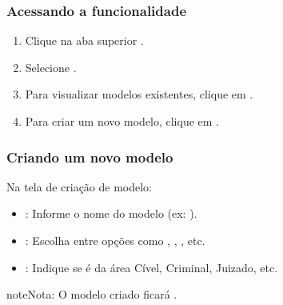 \documentclass[letterpaper,10pt,brazil]{sphinxmanual}
\begin{document}
\subsubsection{Acessando a funcionalidade}
\label{\detokenize{projud_48_criandomodelo:acessando-a-funcionalidade}}\begin{enumerate}
%
\item {} 
\sphinxAtStartPar
Clique na aba superior .

\item {} 
\sphinxAtStartPar
Selecione .

\item {} 
\sphinxAtStartPar
Para visualizar modelos existentes, clique em .

\item {} 
\sphinxAtStartPar
Para criar um novo modelo, clique em .

\end{enumerate}


\subsubsection{Criando um novo modelo}
\label{\detokenize{projud_48_criandomodelo:criando-um-novo-modelo}}
\sphinxAtStartPar
Na tela de criação de modelo:
\begin{itemize}
\item {} 
\sphinxAtStartPar
{}: Informe o nome do modelo (ex: ).

\item {} 
\sphinxAtStartPar
{}: Escolha entre opções como , , , etc.

\item {} 
\sphinxAtStartPar
{}: Indique se é da área Cível, Criminal, Juizado, etc.

\end{itemize}

\begin{sphinxadmonition}{note}{Nota:}
\sphinxAtStartPar
O modelo criado ficará .
\end{sphinxadmonition}
\end{document}

